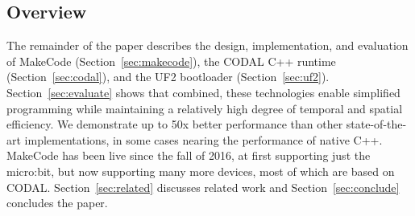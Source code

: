 \subsection{Overview}

The remainder of the paper describes the design, implementation, and evaluation of MakeCode (Section~\ref{sec:makecode}), the CODAL C++ runtime (Section~\ref{sec:codal}), and the UF2 bootloader (Section~\ref{sec:uf2}). Section~\ref{sec:evaluate} shows that combined, these technologies enable simplified programming while maintaining a relatively high degree of temporal and spatial efficiency. We demonstrate up to 50x better performance than other state-of-the-art implementations, in some cases nearing the performance of native C++. MakeCode has been live since the fall of 2016, at first supporting just the micro:bit, but now supporting many more devices, most of which are based on CODAL. Section~\ref{sec:related} discusses related work and Section~\ref{sec:conclude} concludes the paper.









